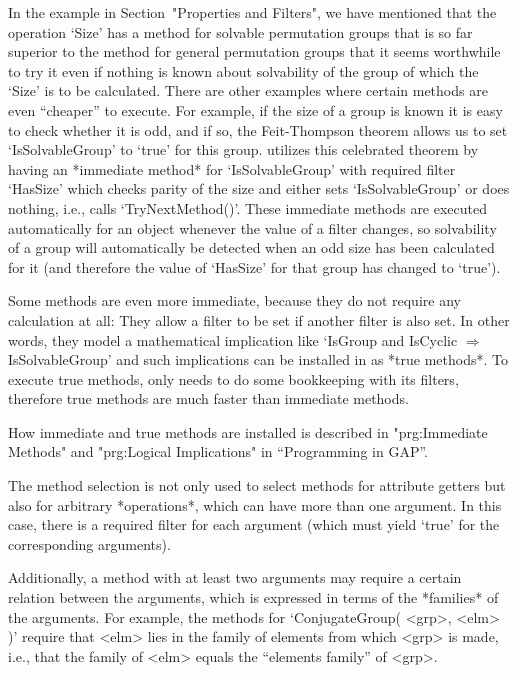 %
In the example in Section~"Properties and Filters",
we have mentioned that the operation `Size' has a
method  for solvable permutation  groups that is  so  far superior to the
method for  general permutation groups that  it seems worthwhile to try it
even if nothing  is  known about solvability   of the group of which  the
`Size' is to   be  calculated. There are   other  examples where  certain
methods  are even ``cheaper'' to  execute. For example,  if the size of a
group is known  it is easy to check  whether  it is  odd, and  if so, the
Feit-Thompson  theorem allows us to set  `IsSolvableGroup' to `true' for
this group.   {\GAP} utilizes   this  celebrated  theorem  by  having  an
*immediate  method* for `IsSolvableGroup'  with required filter `HasSize'
which checks parity of the size and either sets `IsSolvableGroup' or does
nothing, i.e.,   calls `TryNextMethod()'.   These immediate  methods  are
executed  automatically for an  object  whenever the   value of a  filter
changes, so solvability of a group will automatically be detected when an
odd size has been calculated for it (and therefore the value of `HasSize'
for that group has changed to `true').

Some methods are  even more immediate,   because they do not  require any
calculation  at all: They  allow a filter to  be set if another filter is
also set. In other words,   they  model a mathematical implication   like
`IsGroup   and   IsCyclic    $\Rightarrow$   IsSolvableGroup'  and   such
implications  can be installed  in {\GAP}  as  *true methods*. To execute
true methods, {\GAP} only needs to do  some bookkeeping with its filters,
therefore true methods are much faster than immediate methods.

How immediate and true methods are installed is described in 
"prg:Immediate Methods" and "prg:Logical Implications"
in ``Programming in GAP''.


\null

%
The method selection  is not only  used to  select  methods for attribute
getters but also for arbitrary *operations*, which can have more than one
argument.  In this case,   there is a   required filter for each argument
(which must yield `true'  for the corresponding  arguments).

Additionally, a method with at least two arguments may require a certain
relation between the arguments,
which is expressed in terms of the *families* of the arguments.
For example, the methods for  `ConjugateGroup( <grp>, <elm> )'
require that <elm>  lies in the family   of elements from  which <grp> is
made, i.e., that  the family of  <elm> equals the ``elements family''  of
<grp>.

